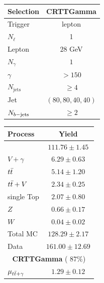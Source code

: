 		\begin{table}
			\parbox{.45\linewidth}{
			\centering
			\label{tab:CRTTGamma}
		   	\begin{tabular}{lc}
			      \toprule
			      \textbf{Selection}  & \textbf{CRTTGamma}     \\
			      \toprule
			      Trigger & lepton \\ 
			      $N_{\ell}$ & 1 \\
			      Lepton \pt & $28$ GeV \\
			      \midrule
			      $N_{\gamma}$ & $1$\\
			      $\gamma$ \pT\ & $> 150$ \GeV \\
			      \midrule
			      $N_{\mathrm{jets}}$ & $ \geq 4 $ \\
			      Jet \pT\ & $(80,80,40,40)$ \GeV \\
			      $N_{b\mathrm{-jets}}$ & $\ge 2$ \\
			      \bottomrule
			   \end{tabular}
			}
			\hfill
			\parbox{.45\linewidth}{
			\centering
			\label{tab:CRTTGamma_yields}
				\begin{tabular}{lc}
					\toprule
					\textbf{Process} & \textbf{Yield} \\
					\midrule
					\ttgamma & $111.76 \pm 1.45$ \\
					$V+\gamma$ & $6.29 \pm 0.63$ \\
					$t\bar{t}$ & $5.14 \pm 1.20$ \\
					$t\bar{t}+V$ & $2.34 \pm 0.25$ \\
					single Top & $2.07 \pm 0.80$ \\
					$Z$ & $0.66 \pm 0.17$ \\
					$W$ & $0.04 \pm 0.02$ \\
					\midrule
					Total MC & $128.29 \pm 2.17$ \\
					Data & $161.00 \pm 12.69$ \\
					\midrule
					\multicolumn{2}{c}{\textbf{CRTTGamma} ( $87\%$)} \\ 
					\midrule
					$\mu_{t\bar{t}+\gamma}$ & $1.29 \pm 0.12$ \\
					\bottomrule
				\end{tabular}
			}
		\end{table}

